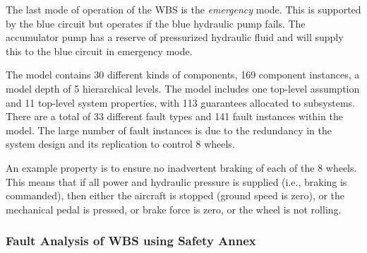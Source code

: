 The last mode of operation of the WBS is the \textit{emergency} mode. This is supported by the blue circuit but operates if the blue hydraulic pump fails. The accumulator pump has a reserve of pressurized hydraulic fluid and will supply this to the blue circuit in emergency mode.

The model contains 30 different kinds of components, 169 component instances, a model depth of 5 hierarchical levels.  The model includes one top-level assumption and  11 top-level system properties, with 113 guarantees allocated to subsystems.  There are a total of 33 different fault types and 141 fault instances within the model.  The large number of fault instances is due to the redundancy in the system design and its replication to control 8 wheels. %


An example property is to ensure no inadvertent braking of each of the 8 wheels.  This means that if all power and hydraulic pressure is supplied (i.e., braking is commanded), then either the aircraft is stopped (ground speed is zero), or the mechanical pedal is pressed, or brake force is zero, or the wheel is not rolling.


\subsubsection{Fault Analysis of WBS using Safety Annex}

\iffalse

